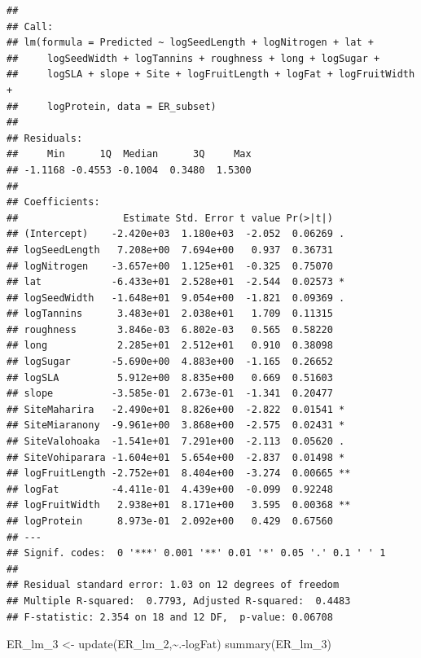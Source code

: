 \documentclass[
  12pt,
]{article}
\newenvironment{Shaded}{\begin{snugshade}}{\end{snugshade}}
\newcommand{\FunctionTok}[1]{\textcolor[rgb]{0.00,0.00,0.00}{#1}}
\newcommand{\NormalTok}[1]{#1}
\newcommand{\OtherTok}[1]{\textcolor[rgb]{0.56,0.35,0.01}{#1}}
\newcommand{\SpecialCharTok}[1]{\textcolor[rgb]{0.00,0.00,0.00}{#1}}
\begin{document}
\begin{verbatim}
## 
## Call:
## lm(formula = Predicted ~ logSeedLength + logNitrogen + lat + 
##     logSeedWidth + logTannins + roughness + long + logSugar + 
##     logSLA + slope + Site + logFruitLength + logFat + logFruitWidth + 
##     logProtein, data = ER_subset)
## 
## Residuals:
##     Min      1Q  Median      3Q     Max 
## -1.1168 -0.4553 -0.1004  0.3480  1.5300 
## 
## Coefficients:
##                  Estimate Std. Error t value Pr(>|t|)   
## (Intercept)    -2.420e+03  1.180e+03  -2.052  0.06269 . 
## logSeedLength   7.208e+00  7.694e+00   0.937  0.36731   
## logNitrogen    -3.657e+00  1.125e+01  -0.325  0.75070   
## lat            -6.433e+01  2.528e+01  -2.544  0.02573 * 
## logSeedWidth   -1.648e+01  9.054e+00  -1.821  0.09369 . 
## logTannins      3.483e+01  2.038e+01   1.709  0.11315   
## roughness       3.846e-03  6.802e-03   0.565  0.58220   
## long            2.285e+01  2.512e+01   0.910  0.38098   
## logSugar       -5.690e+00  4.883e+00  -1.165  0.26652   
## logSLA          5.912e+00  8.835e+00   0.669  0.51603   
## slope          -3.585e-01  2.673e-01  -1.341  0.20477   
## SiteMaharira   -2.490e+01  8.826e+00  -2.822  0.01541 * 
## SiteMiaranony  -9.961e+00  3.868e+00  -2.575  0.02431 * 
## SiteValohoaka  -1.541e+01  7.291e+00  -2.113  0.05620 . 
## SiteVohiparara -1.604e+01  5.654e+00  -2.837  0.01498 * 
## logFruitLength -2.752e+01  8.404e+00  -3.274  0.00665 **
## logFat         -4.411e-01  4.439e+00  -0.099  0.92248   
## logFruitWidth   2.938e+01  8.171e+00   3.595  0.00368 **
## logProtein      8.973e-01  2.092e+00   0.429  0.67560   
## ---
## Signif. codes:  0 '***' 0.001 '**' 0.01 '*' 0.05 '.' 0.1 ' ' 1
## 
## Residual standard error: 1.03 on 12 degrees of freedom
## Multiple R-squared:  0.7793, Adjusted R-squared:  0.4483 
## F-statistic: 2.354 on 18 and 12 DF,  p-value: 0.06708
\end{verbatim}

\begin{Shaded}
\begin{Highlighting}[]
\NormalTok{ER\_lm\_3 }\OtherTok{\textless{}{-}} \FunctionTok{update}\NormalTok{(ER\_lm\_2,}\SpecialCharTok{\textasciitilde{}}\NormalTok{.}\SpecialCharTok{{-}}\NormalTok{logFat)}
\FunctionTok{summary}\NormalTok{(ER\_lm\_3)}
\end{Highlighting}
\end{Shaded}
\end{document}
